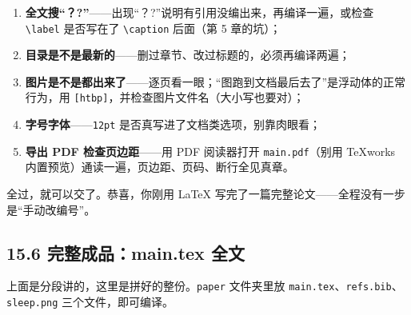 \begin{enumerate}
\setlength{\itemsep}{2pt}
\item \textbf{全文搜“？?”}——出现“？?”说明有引用没编出来，再编译一遍，或检查 \texttt{\textbackslash{}label} 是否写在了 \texttt{\textbackslash{}caption} 后面（第 5 章的坑）；
\item \textbf{目录是不是最新的}——删过章节、改过标题的，必须再编译两遍；
\item \textbf{图片是不是都出来了}——逐页看一眼；“图跑到文档最后去了”是浮动体的正常行为，用 \texttt{[htbp]}，并检查图片文件名（大小写也要对）；
\item \textbf{字号字体}——\texttt{12pt} 是否真写进了文档类选项，别靠肉眼看；
\item \textbf{导出 PDF 检查页边距}——用 PDF 阅读器打开 \texttt{main.pdf}（别用 TeXworks 内置预览）通读一遍，页边距、页码、断行全见真章。
\end{enumerate}

全过，就可以交了。恭喜，你刚用 LaTeX 写完了一篇完整论文——全程没有一步是“手动改编号”。

\subsection*{15.6 完整成品：main.tex 全文}

上面是分段讲的，这里是拼好的整份。\texttt{paper} 文件夹里放 \texttt{main.tex}、\texttt{refs.bib}、\texttt{sleep.png} 三个文件，即可编译。

